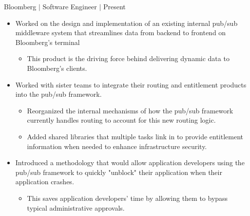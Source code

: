\documentclass[12pt]{article}
\newcommand{\textDate}[3]{\noindent#1 $|$ #2 $|$ {\color{textGray} #3}}
\begin{document}
    \textDate{Bloomberg}{Software Engineer}{Present}
    \begin{small}
        \begin{itemize}
            \itemsep0em 
            \item {\color{textGray} Worked on the design and implementation of an existing internal pub/sub middleware system that streamlines data from backend to frontend on Bloomberg's terminal}
                \begin{itemize}[label=$\circ$,topsep=-5px,partopsep=0px]
                    \itemsep0em 
                    \item {\color{textGray} This product is the driving force behind delivering dynamic data to Bloomberg's clients.}
                \end{itemize}
            \item {\color{textGray} Worked with sister teams to integrate their routing and entitlement products into the pub/sub framework.}
                \begin{itemize}[label=$\circ$,topsep=-5px,partopsep=0px]
                    \itemsep0em 
                    \item {\color{textGray} Reorganized the internal mechanisms of how the pub/sub framework currently handles routing to account for this new routing logic.}
                    \item {\color{textGray} Added shared libraries that multiple tasks link in to provide entitlement information when needed to enhance infrastructure security.}
                \end{itemize}
            \item {\color{textGray} Introduced a methodology that would allow application developers using the pub/sub framework to quickly "unblock" their application when their application crashes.}
                \begin{itemize}[label=$\circ$,topsep=-5px,partopsep=0px]
                    \itemsep0em 
                    \item {\color{textGray} This saves application developers' time by allowing them to bypass typical administrative approvals.}
                \end{itemize}
        \end{itemize}
    \end{small}
\end{document}
